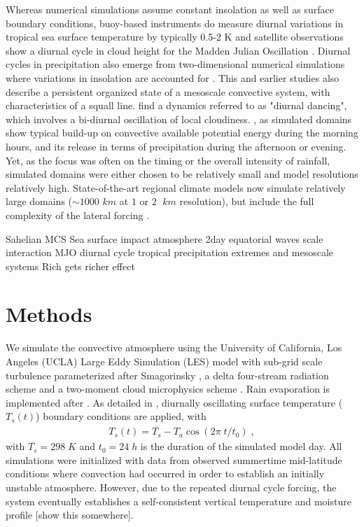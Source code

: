 \documentclass[draft,linenumbers]{agujournal2019}
\begin{document}
Whereas numerical simulations assume constant insolation as well as surface boundary conditions, buoy-based instruments do measure diurnal variations in tropical sea surface temperature by typically 0.5-2 K \cite{weller1996surface,johnson1999trimodal} and satellite observations show a diurnal cycle in cloud height for the Madden Julian Oscillation \cite{suzuki2009diurnal,tian2006modulation}.
Diurnal cycles in precipitation also emerge from two-dimensional numerical simulations where variations in insolation are accounted for \cite{liu1998numerical}. 
This and earlier studies\cite{chen1997diurnal} also describe a persistent organized state of a mesoscale convective system, with characteristics of a squall line.
\cite{chen1997diurnal} find a dynamics referred to as "diurnal dancing", which involves a bi-diurnal oscillation of local cloudiness.
\cite{guichard2004modelling,brown2002large,petch2002impact,schlemmer2011diurnal,moseley2016,haerter2018intensified}, as simulated domains show typical build-up on convective available potential energy during the morning hours, and its release in terms of precipitation during the afternoon or evening.
Yet, as the focus was often on the timing or the overall intensity of rainfall, simulated domains were either chosen to be relatively small and model resolutions relatively high. 
State-of-the-art regional climate models now simulate relatively large domains ($\sim 1000$ $km$ at $1$ or $2$ $\;km$ resolution), but include the full complexity of the lateral forcing \cite{ban2015heavy}. 

Sahelian MCS \cite{mathon2001life}
Sea surface impact atmosphere \cite{kawai2007diurnal}
2day equatorial waves \cite{haertel2004dynamics}
scale interaction MJO diurnal cycle \cite{peatman2014propagation}
tropical precipitation extremes and mesoscale systems \cite{rossow2013tropical}
Rich gets richer effect \cite{chou2009evaluating}

\section{Methods}\label{sec:methods}
We simulate the convective atmosphere using the University of California, Los Angeles (UCLA) Large Eddy Simulation (LES) model with sub-grid scale turbulence parameterized after Smagorinsky \cite{smagorinsky1963general}, a delta four-stream radiation scheme \cite{pincus} and a two-moment cloud microphysics scheme \cite{stevens2005}. 
Rain evaporation is implemented after \citet{seifert2006two}.
As detailed in \cite{moseley2016}, diurnally oscillating surface temperature ($T_s(t)$) boundary conditions are applied, with
\begin{eqnarray}
  T_s(t)=\overline{T_{s}}-T_{a} \cos{(2\pi\;t/t_0)}\;,
\end{eqnarray}
\noindent
with $\overline{T_{s}}=298\;K$ and $t_0=24\;h$ is the duration of the simulated model day.
All simulations were initialized with data from observed summertime mid-latitude conditions where convection had occurred in order to establish an initially unstable atmosphere. 
However, due to the repeated diurnal cycle forcing, the system eventually establishes a self-consistent vertical temperature and moisture profile [show this somewhere].
\end{document}
